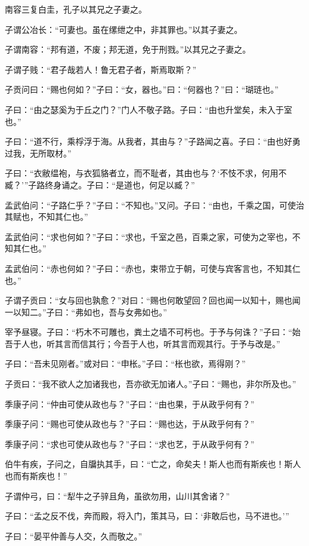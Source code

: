 \documentclass[a5paper]{ctexbook}
\begin{document}
    南容三复白圭，孔子以其兄之子妻之。

    子谓公冶长：“可妻也。虽在缧绁之中，非其罪也。”以其子妻之。

    子谓南容：“邦有道，不废；邦无道，免于刑戮。”以其兄之子妻之。

    子谓子贱：“君子哉若人！鲁无君子者，斯焉取斯？”

    子贡问曰：“赐也何如？”子曰：“女，器也。”曰：“何器也？”曰：“瑚琏也。”

    子曰：“由之瑟奚为于丘之门？”门人不敬子路。子曰：“由也升堂矣，未入于室也。”

    子曰：“道不行，乘桴浮于海。从我者，其由与？”子路闻之喜。子曰：“由也好勇过我，无所取材。”

    子曰：“衣敝缊袍，与衣狐貉者立，而不耻者，其由也与？‘不忮不求，何用不臧？’”子路终身诵之。子曰：“是道也，何足以臧？”

    孟武伯问：“子路仁乎？”子曰：“不知也。”又问。子曰：“由也，千乘之国，可使治其赋也，不知其仁也。”
    
    孟武伯问：“求也何如？”子曰：“求也，千室之邑，百乘之家，可使为之宰也，不知其仁也。”
    
    孟武伯问：“赤也何如？”子曰：“赤也，束带立于朝，可使与宾客言也，不知其仁也。”

    子谓子贡曰：“女与回也孰愈？”对曰：“赐也何敢望回？回也闻一以知十，赐也闻一以知二。”子曰：“弗如也，吾与女弗如也。”

    宰予昼寝。子曰：“朽木不可雕也，粪土之墙不可杇也。于予与何诛？”子曰：“始吾于人也，听其言而信其行；今吾于人也，听其言而观其行。于予与改是。”

    子曰：“吾未见刚者。”或对曰：“申枨。”子曰：“枨也欲，焉得刚？”

    子贡曰：“我不欲人之加诸我也，吾亦欲无加诸人。”子曰：“赐也，非尔所及也。”

    季康子问：“仲由可使从政也与？”子曰：“由也果，于从政乎何有？”
    
    季康子问：“赐也可使从政也与？”子曰：“赐也达，于从政乎何有？”
    
    季康子问：“求也可使从政也与？”子曰：“求也艺，于从政乎何有？”

    伯牛有疾，子问之，自牖执其手，曰：“亡之，命矣夫！斯人也而有斯疾也！斯人也而有斯疾也！”

    子谓仲弓，曰：“犁牛之子骍且角，虽欲勿用，山川其舍诸？”

    子曰：“孟之反不伐，奔而殿，将入门，策其马，曰：‘非敢后也，马不进也。’”

    子曰：“晏平仲善与人交，久而敬之。”
\end{document}
